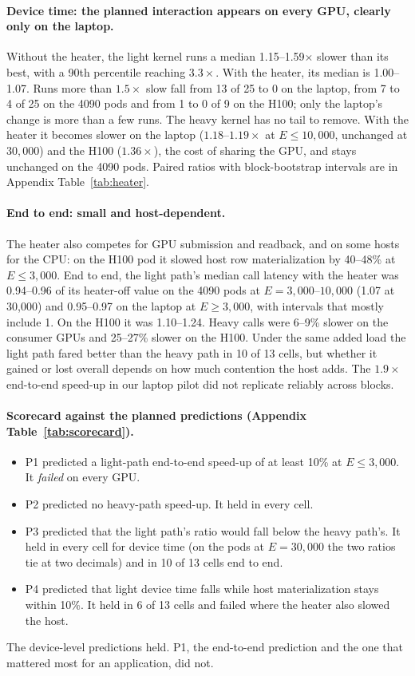 \paragraph{Device time: the planned interaction appears on every GPU, clearly only on the laptop.} Without the heater, the light kernel runs a median 1.15--1.59$\times$ slower than its best, with a 90th percentile reaching $3.3\times$. With the heater, its median is 1.00--1.07. Runs more than $1.5\times$ slow fall from 13 of 25 to 0 on the laptop, from 7 to 4 of 25 on the 4090 pods and from 1 to 0 of 9 on the H100; only the laptop's change is more than a few runs. The heavy kernel has no tail to remove. With the heater it becomes slower on the laptop ($1.18$--$1.19\times$ at $E\le 10{,}000$, unchanged at $30{,}000$) and the H100 ($1.36\times$), the cost of sharing the GPU, and stays unchanged on the 4090 pods. Paired ratios with block-bootstrap intervals are in Appendix Table~\ref{tab:heater}.

\paragraph{End to end: small and host-dependent.} The heater also competes for GPU submission and readback, and on some hosts for the CPU: on the H100 pod it slowed host row materialization by 40--48\% at $E\le 3{,}000$. End to end, the light path's median call latency with the heater was 0.94--0.96 of its heater-off value on the 4090 pods at $E=3{,}000$--$10{,}000$ (1.07 at 30{,}000) and 0.95--0.97 on the laptop at $E\ge 3{,}000$, with intervals that mostly include 1. On the H100 it was 1.10--1.24. Heavy calls were 6--9\% slower on the consumer GPUs and 25--27\% slower on the H100. Under the same added load the light path fared better than the heavy path in 10 of 13 cells, but whether it gained or lost overall depends on how much contention the host adds. The $1.9\times$ end-to-end speed-up in our laptop pilot did not replicate reliably across blocks.

\paragraph{Scorecard against the planned predictions (Appendix Table~\ref{tab:scorecard}).}
\begin{itemize}
\item P1 predicted a light-path end-to-end speed-up of at least 10\% at $E\le 3{,}000$. It \emph{failed} on every GPU.
\item P2 predicted no heavy-path speed-up. It held in every cell.
\item P3 predicted that the light path's ratio would fall below the heavy path's. It held in every cell for device time (on the pods at $E=30{,}000$ the two ratios tie at two decimals) and in 10 of 13 cells end to end.
\item P4 predicted that light device time falls while host materialization stays within 10\%. It held in 6 of 13 cells and failed where the heater also slowed the host.
\end{itemize}
The device-level predictions held. P1, the end-to-end prediction and the one that mattered most for an application, did not.

